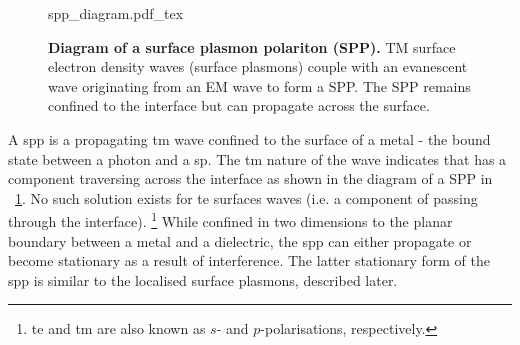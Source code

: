 \documentclass{article}
\begin{document}
\begin{figure}[bt]
\fontsize{10pt}{1em}\selectfont
\def\svgwidth{0.6\textwidth}
{spp_diagram.pdf_tex}
\caption[Diagram of a surface plasmon polariton (SPP)]{\textbf{Diagram of a surface plasmon polariton (SPP).} TM surface electron density waves (surface plasmons) couple with an evanescent wave originating from an EM wave to form a SPP. The SPP remains confined to the interface but can propagate across the surface.}
\label{fig:spp_diagram}
\end{figure}

A \gls{spp} is a propagating \gls{tm} wave confined to the surface of a metal - the bound state between a photon and a \gls{sp}.
The \gls{tm} nature of the wave indicates that  has a component traversing across the interface as shown in the diagram of a SPP in \figurename~\ref{fig:spp_diagram}. No such solution exists for \gls{te} surfaces waves (i.e. a component of  passing through the interface).%
\footnote{\gls{te} and \gls{tm} are also known as $s$- and $p$-polarisations, respectively.}
While confined in two dimensions to the planar boundary between a metal and a dielectric, the \gls{spp} can either propagate or become stationary as a result of interference. The latter stationary form of the \gls{spp} is similar to the localised surface plasmons, described later.
\end{document}
